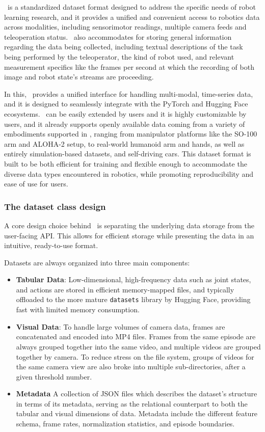 \lerobotdataset~is a standardized dataset format designed to address the specific needs of robot learning research, and it provides a unified and convenient access to robotics data across modalities, including sensorimotor readings, multiple camera feeds and teleoperation status.
\lerobotdataset~also accommodates for storing general information regarding the data being collected, including textual descriptions of the task being performed by the teleoperator, the kind of robot used, and relevant measurement specifics like the frames per second at which the recording of both image and robot state's streams are proceeding.

In this, \lerobotdataset~provides a unified interface for handling multi-modal, time-series data, and it is designed to seamlessly integrate with the PyTorch and Hugging Face ecosystems.
\lerobotdataset~can be easily extended by users and it is highly customizable by users, and it already supports openly available data coming from a variety of embodiments supported in \lerobot, ranging from manipulator platforms like the SO-100 arm and ALOHA-2 setup, to real-world humanoid arm and hands, as well as entirely simulation-based datasets, and self-driving cars.
This dataset format is built to be both efficient for training and flexible enough to accommodate the diverse data types encountered in robotics, while promoting reproducibility and ease of use for users. 

\subsubsection{The dataset class design}

A core design choice behind \lerobotdataset~is separating the underlying data storage from the user-facing API.
This allows for efficient storage while presenting the data in an intuitive, ready-to-use format.

Datasets are always organized into three main components:
\begin{itemize}
\item \textbf{Tabular Data}: Low-dimensional, high-frequency data such as joint states, and actions are stored in efficient memory-mapped files, and typically offloaded to the more mature \texttt{datasets} library by Hugging Face, providing fast with limited memory consumption.
\item \textbf{Visual Data}: To handle large volumes of camera data, frames are concatenated and encoded into MP4 files. Frames from the same episode are always grouped together into the same video, and multiple videos are grouped together by camera. To reduce stress on the file system, groups of videos for the same camera view are also broke into multiple sub-directories, after a given threshold number.
\item \textbf{Metadata} A collection of JSON files which describes the dataset's structure in terms of its metadata, serving as the relational counterpart to both the tabular and visual dimensions of data. Metadata include the different feature schema, frame rates, normalization statistics, and episode boundaries.
\end{itemize}

